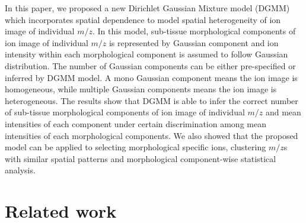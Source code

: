 \documentclass{bioinfo}
\begin{document}
In this paper, we proposed a new Dirichlet Gaussian Mixture model (DGMM) which incorporates spatial dependence to model spatial heterogeneity of ion image of individual $m/z$. In this model, sub-tissue morphological components of ion image of individual $m/z$ is represented by Gaussian component and ion intensity within each morphological component is assumed to follow Gaussian distribution.  The number of Gaussian components can be either pre-specified or inferred by DGMM model. A mono Gaussian component means the ion image is homogeneous, while multiple Gaussian components means the ion image is heterogeneous. The results show that DGMM is able to infer the correct number of sub-tissue morphological components of ion image of individual $m/z$ and mean intensities of each component under certain discrimination among mean intensities of each morphological components. We also showed that the proposed model can be applied to selecting morphological specific ions, clustering $m/z$s with similar spatial patterns and morphological component-wise statistical analysis.


\section{Related work}
\end{document}
